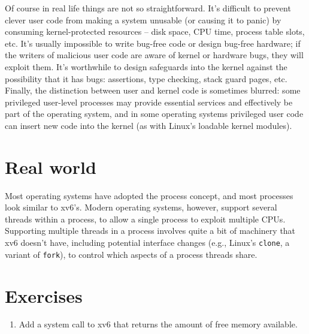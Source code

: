 Of course in real life things are not so straightforward. It's
difficult to prevent clever user code from making a system unusable
(or causing it to panic) by consuming kernel-protected resources --
disk space, CPU time, process table slots, etc. It's usually
impossible to write bug-free code or design bug-free hardware; if the
writers of malicious user code are aware of kernel or hardware bugs,
they will exploit them. It's worthwhile to design safeguards into the
kernel against the possibility that it has bugs: assertions, type
checking, stack guard pages, etc. Finally, the distinction between
user and kernel code is sometimes blurred: some privileged user-level
processes may provide essential services and effectively be part of
the operating system, and in some operating systems privileged user
code can insert new code into the kernel (as with Linux's loadable
kernel modules).


\section{Real world}

Most operating systems have adopted the process concept, and most
processes look similar to xv6's.  Modern operating systems, however,
support several threads within a process, to allow a single process to
exploit multiple CPUs.  Supporting multiple threads in a
process involves quite a bit of machinery that xv6 doesn't have,
including potential interface changes (e.g., Linux's
\lstinline{clone},
a variant of
\lstinline{fork}),
to control which aspects of
a process threads share.
\section{Exercises}

\begin{enumerate}

\item Add a system call to xv6
  that returns the amount of free memory available.


\end{enumerate}
